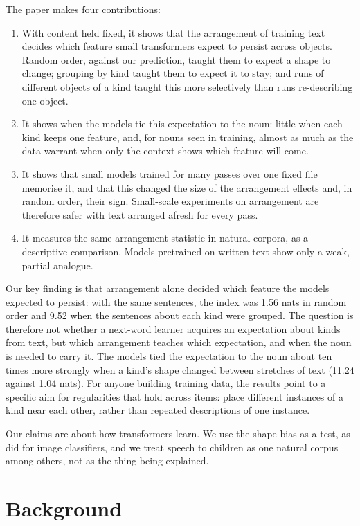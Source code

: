 The paper makes four contributions:

\begin{enumerate}
\item With content held fixed, it shows that the arrangement of training text decides which feature small transformers expect to persist across objects. Random order, against our prediction, taught them to expect a shape to change; grouping by kind taught them to expect it to stay; and runs of different objects of a kind taught this more selectively than runs re-describing one object.
\item It shows when the models tie this expectation to the noun: little when each kind keeps one feature, and, for nouns seen in training, almost as much as the data warrant when only the context shows which feature will come.
\item It shows that small models trained for many passes over one fixed file memorise it, and that this changed the size of the arrangement effects and, in random order, their sign. Small-scale experiments on arrangement are therefore safer with text arranged afresh for every pass.
\item It measures the same arrangement statistic in natural corpora, as a descriptive comparison. Models pretrained on written text show only a weak, partial analogue.
\end{enumerate}

Our key finding is that arrangement alone decided which feature the models expected to persist: with the same sentences, the index was \textminus{}1.56 nats in random order and 9.52 when the sentences about each kind were grouped. The question is therefore not whether a next-word learner acquires an expectation about kinds from text, but which arrangement teaches which expectation, and when the noun is needed to carry it. The models tied the expectation to the noun about ten times more strongly when a kind's shape changed between stretches of text (11.24 against 1.04 nats). For anyone building training data, the results point to a specific aim for regularities that hold across items: place different instances of a kind near each other, rather than repeated descriptions of one instance.

Our claims are about how transformers learn. We use the shape bias as a test, as \citet{ritter2017} did for image classifiers, and we treat speech to children as one natural corpus among others, not as the thing being explained.

\section{Background}
